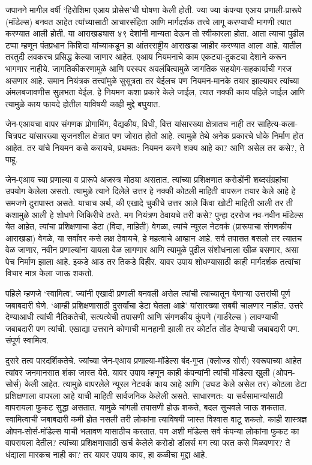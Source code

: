 जपानने मागील वर्षी `हिरोशिमा एआय प्रोसेस'ची घोषणा केली होती. ज्या ज्या कंपन्या एआय प्रणाली-प्रारूपे (मॉडेल्स) बनवत आहेत त्यांच्यासाठी आचारसंहिता आणि मार्गदर्शक तत्त्वे लागू करण्याची मागणी त्यात करण्यात आली होती. या आराखड्यास ४९ देशांनी मान्यता देऊन तो स्वीकारला होता. आता त्याचा पुढील टप्पा म्हणून पंतप्रधान किशिदा यांच्याकडून हा आंतरराष्ट्रीय आराखडा जाहीर करण्यात आला आहे. यातील तरतुदी लवकरच प्रसिद्ध केल्या जाणार आहेत. एआय नियमनाचे काम एकट्या-दुकट्या देशाने करून भागणार नाहीये. जागतिकीकरणामुळे आणि परस्पर अवलंबित्वामुळे जागतिक सहयोग-सहकार्याची गरज असणार आहे. समान नियंत्रक तत्त्वांमुळे सुसूत्रता तर येईलच पण नियमन-मानके तयार झाल्यावर त्यांच्या अंमलबजावणीस सुलभता येईल. हे नियमन कशा प्रकारे केले जाईल, त्यात नक्की काय पहिले जाईल आणि त्यामुळे काय फायदे होतील याविषयी काही मुद्दे बघुयात.

जेन-एआयचा वापर संगणक प्रोगामिंग, वैद्यकीय, विधी, वित्त यांसारख्या क्षेत्रातच नाही तर साहित्य-कला-चित्रपट यांसारख्या सृजनशील क्षेत्रात पण जोरात होतो आहे. त्यामुळे तेथे अनेक प्रकारचे धोके निर्माण होत आहेत. तर यांचे नियमन कसे करायचे, प्रथमतः: नियमन करणे शक्य आहे का? आणि असेल तर कसे?, ते पाहू.

जेन-एआय च्या प्रणाल्या व प्रारूपे अजस्त्र मोठ्या असतात. त्यांच्या प्रशिक्षणात करोडोंनी शब्दसंग्रहांचा उपयोग केलेला असतो. त्यामुळे त्याने दिलेले उत्तर हे नक्की कोठली माहिती वापरून तयार केले आहे हे समजणे दुरापास्त असते. याचाच अर्थ, की एखादे चुकीचे उत्तर आले किंवा खोटी माहिती आली तर ती कशामुळे आली हे शोधणे जिकिरीचे ठरते. मग नियंत्रण ठेवायचे तरी कसे? पुन्हा दररोज नव-नवीन मॉडेल्स येत आहेत, त्यांचा प्रशिक्षणाचा डेटा (विदा, माहिती) वेगळा, त्यांचे न्यूरल नेटवर्क (प्रारूपाचा संगणकीय आराखडा) वेगळे, या सर्वांवर कसे लक्ष ठेवायचे, हे महत्वाचे आव्हान आहे. सर्व तपासत बसलो तर त्यातच वेळ जाणार, नवीन प्रणाल्यांना यायला वेळ लागणार आणि त्यामुळे पुढील संशोधनाला खीळ बसणार, असा पेच निर्माण झाला आहे. इकडे आड तर तिकडे विहीर. यावर उपाय शोधण्यासाठी काही मार्गदर्शक तत्वांचा विचार मात्र केला जाऊ शकतो.

पहिले म्हणजे `स्वामित्व'. ज्यांनी एखादी प्रणाली बनवली असेल त्यांची त्याच्यातून येणाऱ्या उत्तरांची पूर्ण जबाबदारी घेणे. `आम्ही प्रशिक्षणासाठी दुसर्यांचा डेटा घेतला आहे' यांसारख्या सबबी चालणार नाहीत. उत्तरे देण्याआधी त्यांची नैतिकतेची, सत्यत्येची तपासणी आणि संगणकीय कुंपणे (गार्डरेल्स ) लावण्याची जबाबदारी पण त्यांची. एखाद्या उत्तराने कोणाची मानहानी झाली तर कोर्टात तोंड देण्याची जबाबदारी पण. संपूर्ण स्वामित्व.

दुसरे तत्व पारदर्शिकतेचे. ज्यांच्या जेन-एआय प्रणाल्या-मॉडेल्स बंद-गुप्त (क्लोज्ड सोर्स) स्वरूपाच्या आहेत त्यांवर जनमानसात शंका जास्त येते. यावर उपाय म्हणून काही कंपन्यांनी त्यांची मॉडेल्स खुली (ओपन-सोर्स) केली आहेत. त्यामुळे वापरलेले न्यूरल नेटवर्क काय आहे आणि (उघड केले असेल तर) कोठला डेटा प्रशिक्षणाला वापरला आहे याची माहिती सार्वजनिक केलेली असते. साधारणतः: या सर्वसामान्यांसाठी वापरायला फुकट सुद्धा असतात. यामुळे चांगली तपासणी होऊ शकते, बदल सुचवले जाऊ शकतात. स्वामित्वाची जबाबदारी कमी होत नसली तरी लोकांना त्याविषयी जास्त विश्वास वाटू शकतो. काही शास्त्रज्ञ ओपन-सोर्स-मॉडेल्स याची भलावण यासाठीच करतात. पण अशी मॉडेल्स सर्व कंपन्या लोकांना फुकट का वापरायला देतील? त्यांच्या प्रशिक्षणासाठी खर्च केलेले करोडो डॉलर्स मग त्या परत कसे मिळवणार? ते धंद्याला मारकच नाही का? तर यावर उपाय काय, हा कळीचा मुद्दा आहे.

